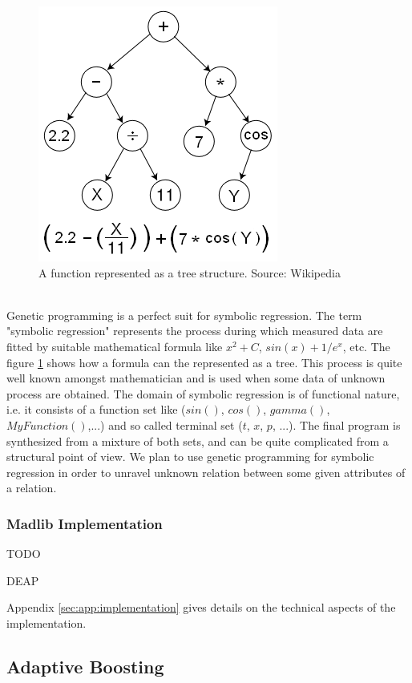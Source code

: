\begin{figure}[htb]
	\centering	
		\includegraphics[scale=0.45]{Genetic_Program_Tree.png}
	\caption[A function represented as a tree structure.]{A function represented as a tree structure. Source: Wikipedia}
	\label{fig:Genetic_Program_Tree}
\end{figure}

~~\\
Genetic programming is a perfect suit for symbolic regression. The term "symbolic regression" represents the process during which measured data are fitted by suitable mathematical formula like $x^2 + C$, $sin(x) + 1/e^x$,  etc. The figure \ref{fig:Genetic_Program_Tree} shows how a formula can the represented as a tree. This process is quite well known amongst mathematician and is used when some data of unknown process are obtained. The domain of symbolic regression is of functional nature, i.e. it consists of a function set like ($sin()$, $cos()$, $gamma()$, $MyFunction()$,...) and so called terminal set ($t$, $x$, $p$, ...). The final program is synthesized from a mixture of both sets, and can be quite complicated from a structural point of view. We plan to use genetic programming for symbolic regression in order to unravel unknown relation between some given attributes of a relation. 


\subsubsection{Madlib Implementation}
TODO

DEAP

Appendix \ref{sec:app:implementation} gives details on the technical aspects of the implementation.

\subsection{Adaptive Boosting}
